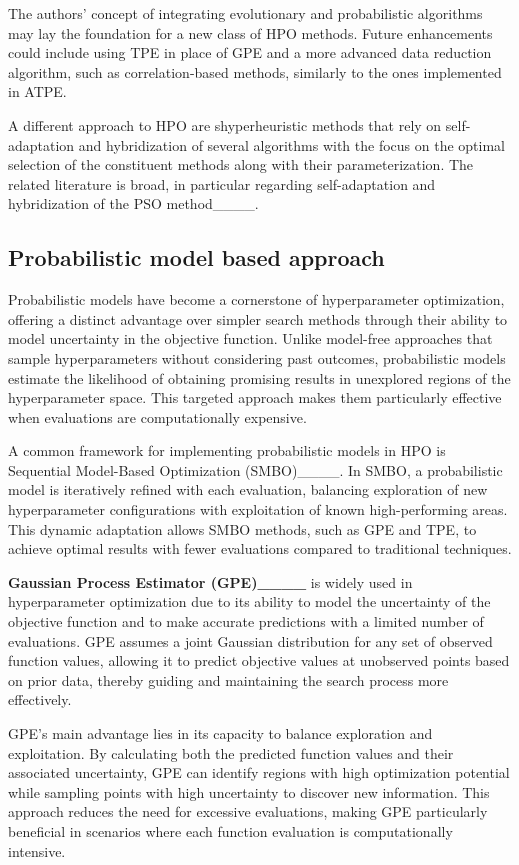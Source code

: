 The authors' concept of integrating evolutionary and probabilistic algorithms may lay the foundation for a new class of HPO methods. Future enhancements could include using TPE in place of GPE and a more advanced data reduction algorithm, such as correlation-based methods, similarly to the ones implemented in ATPE.

A different approach to HPO are shyperheuristic methods that rely on self-adaptation and hybridization of several algorithms with the focus on the optimal selection of the constituent methods along with their parameterization. The related literature is broad, in particular regarding self-adaptation and hybridization of the PSO method____.  

\subsection{Probabilistic model based approach}
\label{sec:TPE}

Probabilistic models have become a cornerstone of hyperparameter optimization, offering a distinct advantage over simpler search methods through their ability to model uncertainty in the objective function. Unlike model-free approaches that sample hyperparameters without considering past outcomes, probabilistic models estimate the likelihood of obtaining promising results in unexplored regions of the hyperparameter space. This targeted approach makes them particularly effective when evaluations are computationally expensive.

A common framework for implementing probabilistic models in HPO is Sequential Model-Based Optimization (SMBO)____. In SMBO, a probabilistic model is iteratively refined with each evaluation, balancing exploration of new hyperparameter configurations with exploitation of known high-performing areas. This dynamic adaptation allows SMBO methods, such as GPE and TPE, to achieve optimal results with fewer evaluations compared to traditional techniques.

\textbf{Gaussian Process Estimator (GPE)____} is widely used in hyperparameter optimization due to its ability to model the uncertainty of the objective function and to make accurate predictions with a limited number of evaluations. GPE assumes a joint Gaussian distribution for any set of observed function values, allowing it to predict objective values at unobserved points based on prior data, thereby guiding and maintaining the search process more effectively.

GPE’s main advantage lies in its capacity to balance exploration and exploitation. By calculating both the predicted function values and their associated uncertainty, GPE can identify regions with high optimization potential while sampling points with high uncertainty to discover new information. This approach reduces the need for excessive evaluations, making GPE particularly beneficial in scenarios where each function evaluation is computationally intensive.

